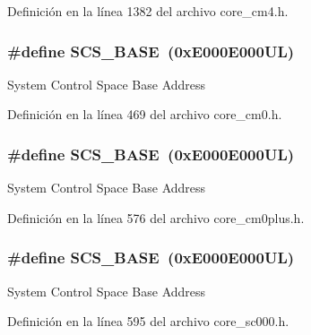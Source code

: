 Definición en la línea 1382 del archivo core\+\_\+cm4.\+h.

\subsubsection[{\texorpdfstring{S\+C\+S\+\_\+\+B\+A\+SE}{SCS_BASE}}]{\setlength{\rightskip}{0pt plus 5cm}\#define S\+C\+S\+\_\+\+B\+A\+SE~(0x\+E000\+E000\+U\+L)}\hypertarget{group___c_m_s_i_s__core__base_ga3c14ed93192c8d9143322bbf77ebf770}{}\label{group___c_m_s_i_s__core__base_ga3c14ed93192c8d9143322bbf77ebf770}
System Control Space Base Address 

Definición en la línea 469 del archivo core\+\_\+cm0.\+h.

\subsubsection[{\texorpdfstring{S\+C\+S\+\_\+\+B\+A\+SE}{SCS_BASE}}]{\setlength{\rightskip}{0pt plus 5cm}\#define S\+C\+S\+\_\+\+B\+A\+SE~(0x\+E000\+E000\+U\+L)}\hypertarget{group___c_m_s_i_s__core__base_ga3c14ed93192c8d9143322bbf77ebf770}{}\label{group___c_m_s_i_s__core__base_ga3c14ed93192c8d9143322bbf77ebf770}
System Control Space Base Address 

Definición en la línea 576 del archivo core\+\_\+cm0plus.\+h.

\subsubsection[{\texorpdfstring{S\+C\+S\+\_\+\+B\+A\+SE}{SCS_BASE}}]{\setlength{\rightskip}{0pt plus 5cm}\#define S\+C\+S\+\_\+\+B\+A\+SE~(0x\+E000\+E000\+U\+L)}\hypertarget{group___c_m_s_i_s__core__base_ga3c14ed93192c8d9143322bbf77ebf770}{}\label{group___c_m_s_i_s__core__base_ga3c14ed93192c8d9143322bbf77ebf770}
System Control Space Base Address 

Definición en la línea 595 del archivo core\+\_\+sc000.\+h.

